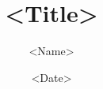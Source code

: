 \documentclass{article}
\begin{document}
\title{<Title>}
\author{<Name>}
\date{<Date>}
\maketitle

\newpage

\end{document}

